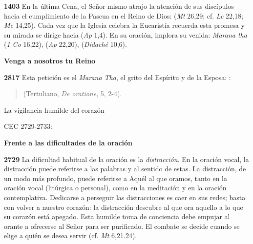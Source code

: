 \begin{body}
\textbf{1403} En la última Cena, el Señor mismo atrajo la atención de sus discípulos hacia el cumplimiento de la Pascua en el Reino de Dios:  (\emph{Mt} 26,29; cf. \emph{Lc} 22,18; \emph{Mc} 14,25). Cada vez que la Iglesia celebra la Eucaristía recuerda esta promesa y su mirada se dirige hacia  (\emph{Ap} 1,4). En su oración, implora su venida: \emph{Marana tha} (\emph{1 Co} 16,22),  (\emph{Ap} 22,20),  (\emph{Didaché} 10,6).

\textbf{Venga a nosotros tu Reino}

\textbf{2817} Esta petición es el \emph{Marana Tha}, el grito del Espíritu y de la Esposa: :

\begin{quote}  (Tertuliano, \emph{De oratione}, 5, 2-4). \end{quote}

La vigilancia humilde del corazón

CEC 2729-2733:

\textbf{Frente a las dificultades de la oración}

\textbf{2729} La dificultad habitual de la oración es la \emph{distracción}. En la oración vocal, la distracción puede referirse a las palabras y al sentido de estas. La distracción, de un modo más profundo, puede referirse a Aquél al que oramos, tanto en la oración vocal (litúrgica o personal), como en la meditación y en la oración contemplativa. Dedicarse a perseguir las distracciones es caer en sus redes; basta con volver a nuestro corazón: la distracción descubre al que ora aquello a lo que su corazón está apegado. Esta humilde toma de conciencia debe empujar al orante a ofrecerse al Señor para ser purificado. El combate se decide cuando se elige a quién se desea servir (cf. \emph{Mt} 6,21.24).


\end{body}
